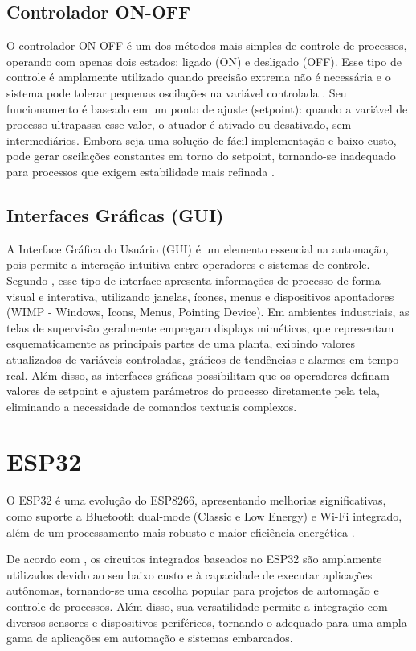 \subsection{Controlador ON-OFF}
O controlador ON-OFF é um dos métodos mais simples de controle de processos, operando com apenas dois estados: ligado (ON) e desligado (OFF). Esse tipo de controle é amplamente utilizado quando precisão extrema não é necessária e o sistema pode tolerar pequenas oscilações na variável controlada \cite{BOLTON2021}. Seu funcionamento é baseado em um ponto de ajuste (setpoint): quando a variável de processo ultrapassa esse valor, o atuador é ativado ou desativado, sem intermediários. Embora seja uma solução de fácil implementação e baixo custo, pode gerar oscilações constantes em torno do setpoint, tornando-se inadequado para processos que exigem estabilidade mais refinada \cite{SEBORG2016}.

\subsection{Interfaces Gráficas (GUI)}
A Interface Gráfica do Usuário (GUI) é um elemento essencial na automação, pois permite a interação intuitiva entre operadores e sistemas de controle. Segundo , esse tipo de interface apresenta informações de processo de forma visual e interativa, utilizando janelas, ícones, menus e dispositivos apontadores (WIMP - Windows, Icons, Menus, Pointing Device). Em ambientes industriais, as telas de supervisão geralmente empregam displays miméticos, que representam esquematicamente as principais partes de uma planta, exibindo valores atualizados de variáveis controladas, gráficos de tendências e alarmes em tempo real. Além disso, as interfaces gráficas possibilitam que os operadores definam valores de setpoint e ajustem parâmetros do processo diretamente pela tela, eliminando a necessidade de comandos textuais complexos.



\section{ESP32}

O ESP32 é uma evolução do ESP8266, apresentando melhorias significativas, como suporte a Bluetooth dual-mode (Classic e Low Energy) e Wi-Fi integrado, além de um processamento mais robusto e maior eficiência energética \cite{TOLLERVEY2017}.

De acordo com , os circuitos integrados baseados no ESP32 são amplamente utilizados devido ao seu baixo custo e à capacidade de executar aplicações autônomas, tornando-se uma escolha popular para projetos de automação e controle de processos. Além disso, sua versatilidade permite a integração com diversos sensores e dispositivos periféricos, tornando-o adequado para uma ampla gama de aplicações em automação e sistemas embarcados.

